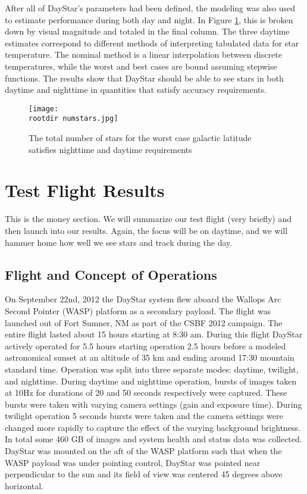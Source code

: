 \documentclass[twocolumn,letterpaper]{IEEEAerospace2012}
\newcommand{\rootdir}{./Figures/}
\begin{document}
After all of DayStar's parameters had been defined, the modeling was also used to estimate performance during both day and night. In Figure \ref{fig:numstars}, this is broken down by visual magnitude and totaled in the final column. The three daytime estimates correspond to different methods of interpreting tabulated data for star temperature. The nominal method is a linear interpolation between discrete temperatures, while the worst and best cases are bound assuming stepwise functions. The results show that DayStar should be able to see stars in both daytime and nighttime in quantities that satisfy accuracy requirements.
\begin{figure}[H]
    \label{fig:numstars}
    \texttt{[image: \\rootdir numstars.jpg]}
    \caption{The total number of stars for the worst case galactic latitude satisfies nighttime and daytime requirements}
\end{figure}

\section{Test Flight Results}
This is the money section. We will summarize our test flight (very briefly) and then launch into our results. Again, the focus will be on daytime, and we will hammer home how well we see stars and track during the day.

\subsection{Flight and Concept of Operations}
On September 22nd, 2012 the DayStar system flew aboard the Wallops Arc Second Pointer (WASP) platform as a secondary payload. The flight was launched out of Fort Sumner, NM as part of the CSBF 2012 campaign. The entire flight lasted about 15 hours starting at 8:30 am. During this flight DayStar actively operated for 5.5 hours starting operation 2.5 hours before a modeled astronomical sunset at an altitude of 35 km and ending around 17:30 mountain standard time. Operation was split into three separate modes: daytime, twilight, and nighttime. During daytime and nighttime operation, bursts of images taken at 10Hz for durations of 20 and 50 seconds respectively were captured. These bursts were taken with varying camera settings (gain and exposure time). During twilight operation 5 seconds bursts were taken and the camera settings were changed more rapidly to capture the effect of the varying background brightness. In total some 460 GB of images and system health and status data was collected. DayStar was
mounted on the aft of the WASP platform such that when the WASP payload was under pointing control, DayStar was pointed near perpendicular to the sun and its field of view was centered 45 degrees above horizontal.
\end{document}
